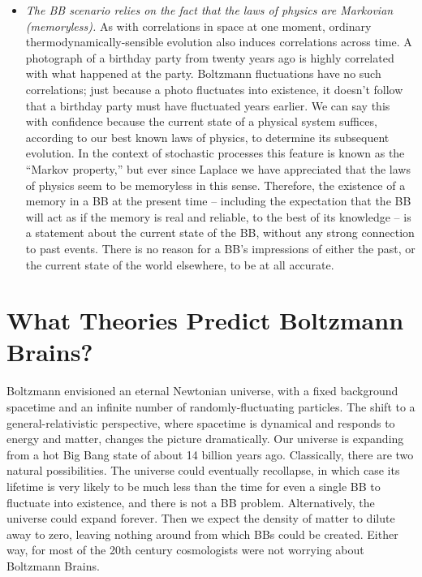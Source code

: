 \documentclass[12pt,letterpaper]{article}
\begin{document}
\begin{itemize}
\item{}\emph{The BB scenario relies on the fact that the laws of physics are Markovian (memoryless).}
As with correlations in space at one moment, ordinary thermodynamically-sensible evolution also induces correlations across time.
A photograph of a birthday party from twenty years ago is highly correlated with what happened at the party.
Boltzmann fluctuations have no such correlations; just because a photo fluctuates into existence, it doesn't follow that a birthday party must have fluctuated years earlier.
We can say this with confidence because the current state of a physical system suffices, according to our best known laws of physics, to determine its subsequent evolution.
In the context of stochastic processes this feature is known as the ``Markov property,'' but ever since Laplace we have appreciated that the laws of physics seem to be memoryless in this sense.
Therefore, the existence of a memory in a BB at the present time -- including the expectation that the BB will act as if the memory is real and reliable, to the best of its knowledge -- is a statement about the current state of the BB, without any strong connection to past events. 
There is no reason for a BB's impressions of either the past, or the current state of the world elsewhere, to be at all accurate.
\end{itemize}

\section{What Theories Predict Boltzmann Brains?}

Boltzmann envisioned an eternal Newtonian universe, with a fixed background spacetime and an infinite number of randomly-fluctuating particles.
The shift to a general-relativistic perspective, where spacetime is dynamical and responds to energy and matter, changes the picture dramatically.
Our universe is expanding from a hot Big Bang state of about 14 billion years ago.
Classically, there are two natural possibilities.
The universe could eventually recollapse, in which case its lifetime is very likely to be much less than the time for even a single BB to fluctuate into existence, and there is not a BB problem.
Alternatively, the universe could expand forever.
Then we expect the density of matter to dilute away to zero, leaving nothing around from which BBs could be created.
Either way, for most of the 20th century cosmologists were not worrying about Boltzmann Brains.
\end{document}

